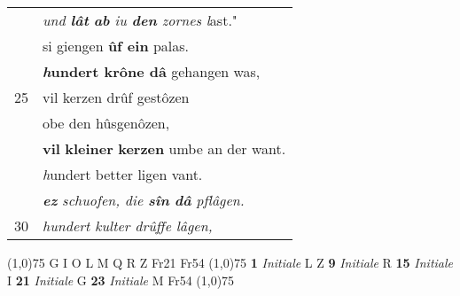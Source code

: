 \documentclass[8pt,a4paper,notitlepage]{article}
\begin{document}
\begin{table}[ht]
\begin{minipage}[t]{0.5\linewidth}
\begin{tabular}{rl}
 & \textit{und \textbf{lât} \textbf{ab} iu \textbf{den} zornes l}ast."\\ 
 & si giengen \textbf{ûf ein} palas.\\ 
 & \textbf{\textit{h}undert krône dâ} gehangen was,\\ 
25 & vil kerzen drûf gestôzen\\ 
 & obe den hûsgenôzen,\\ 
 & \textbf{vil} \textbf{kleiner} \textbf{kerzen} umbe an der want.\\ 
 & \textit{h}undert better ligen vant.\\ 
 & \textit{\textbf{ez} schuofen, die \textbf{sîn} \textbf{dâ} pflâgen.}\\ 
30 & \textit{hundert kulter drûffe lâgen,}\\ 
\end{tabular}
\scriptsize
\line(1,0){75} \newline
G I O L M Q R Z Fr21 Fr54 \newline
\line(1,0){75} \newline
\textbf{1} \textit{Initiale} L Z  \textbf{9} \textit{Initiale} R  \textbf{15} \textit{Initiale} I  \textbf{21} \textit{Initiale} G  \textbf{23} \textit{Initiale} M Fr54  \newline
\line(1,0){75} \newline

\end{minipage}
\end{table}
\end{document}
